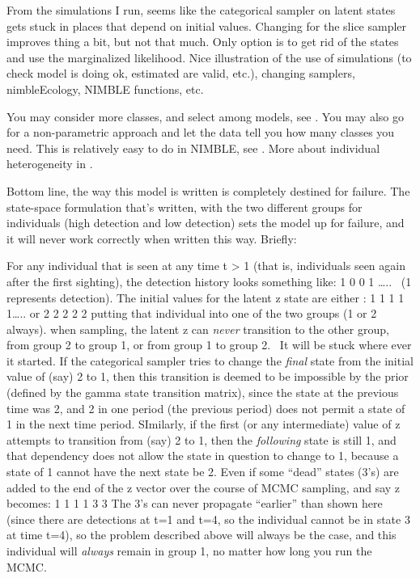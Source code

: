 \documentclass[
  12pt,
]{krantz}
\renewenvironment{quote}{\begin{VF}}{\end{VF}}
\begin{document}
From the simulations I run, seems like the categorical sampler on latent states gets stuck in places that depend on initial values. Changing for the slice sampler improves thing a bit, but not that much. Only option is to get rid of the states and use the marginalized likelihood. Nice illustration of the use of simulations (to check model is doing ok, estimated are valid, etc.), changing samplers, nimbleEcology, NIMBLE functions, etc.

You may consider more classes, and select among models, see \citet{cubaynes2012}. You may also go for a non-parametric approach and let the data tell you how many classes you need. This is relatively easy to do in NIMBLE, see \citet{turek_bayesian_2021}. More about individual heterogeneity in \citet{gimenez2018ih}.

\begin{quote}
Bottom line, the way this model is written is completely destined for failure. The state-space formulation that's written, with the two different groups for individuals (high detection and low detection) sets the model up for failure, and it will never work correctly when written this way. Briefly:
\end{quote}

\begin{quote}
For any individual that is seen at any time t \textgreater{} 1 (that is, individuals seen again after the first sighting), the detection history looks something like:
1 0 0 1 \ldots..~ (1 represents detection).
The initial values for the latent z state are either :
1 1 1 1 1\ldots..
or
2 2 2 2 2
putting that individual into one of the two groups (1 or 2 always).
when sampling, the latent z can \emph{never } transition to the other group, from group 2 to group 1, or from group 1 to group 2.~ It will be stuck where ever it started.
If the categorical sampler tries to change the \emph{final} state from the initial value of (say) 2 to 1,
then this transition is deemed to be impossible by the prior (defined by the gamma state transition matrix), since the state at the previous time was 2, and 2 in one period (the previous period) does not permit a state of 1 in the next time period.
SImilarly, if the first (or any intermediate) value of z attempts to transition from (say) 2 to 1, then the \emph{following} state is still 1, and that dependency does not allow the state in question to change to 1, because a state of 1 cannot have the next state be 2.
Even if some ``dead'' states (3's) are added to the end of the z vector over the course of MCMC sampling, and say z becomes:
1 1 1 1 3 3
The 3's can never propagate ``earlier'' than shown here (since there are detections at t=1 and t=4, so the individual cannot be in state 3 at time t=4), so the problem described above will always be the case, and this individual will \emph{always} remain in group 1, no matter how long you run the MCMC.
\end{quote}
\end{document}
